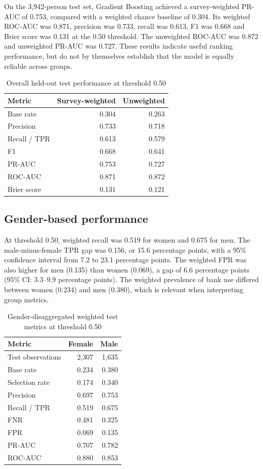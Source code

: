 \documentclass[11pt,a4paper]{article}
\begin{document}
On the 3,942-person test set, Gradient Boosting achieved a survey-weighted PR-AUC of 0.753, compared with a weighted chance baseline of 0.304. Its weighted ROC-AUC was 0.871, precision was 0.733, recall was 0.613, F1 was 0.668 and Brier score was 0.131 at the 0.50 threshold. The unweighted ROC-AUC was 0.872 and unweighted PR-AUC was 0.727. These results indicate useful ranking performance, but do not by themselves establish that the model is equally reliable across groups.

\begin{table}[H]
\centering
\caption{Overall held-out test performance at threshold 0.50}
\label{tab:test}
\begin{tabular}{lrr}
\toprule
Metric & Survey-weighted & Unweighted\\
\midrule
Base rate & 0.304 & 0.263\\
Precision & 0.733 & 0.718\\
Recall / TPR & 0.613 & 0.579\\
F1 & 0.668 & 0.641\\
PR-AUC & 0.753 & 0.727\\
ROC-AUC & 0.871 & 0.872\\
Brier score & 0.131 & 0.121\\
\bottomrule
\end{tabular}
\end{table}

\subsection{Gender-based performance}

At threshold 0.50, weighted recall was 0.519 for women and 0.675 for men. The male-minus-female TPR gap was 0.156, or 15.6 percentage points, with a 95\% confidence interval from 7.2 to 23.1 percentage points. The weighted FPR was also higher for men (0.135) than women (0.069), a gap of 6.6 percentage points (95\% CI: 3.3--9.9 percentage points). The weighted prevalence of bank use differed between women (0.234) and men (0.380), which is relevant when interpreting group metrics.

\begin{table}[H]
\centering
\caption{Gender-disaggregated weighted test metrics at threshold 0.50}
\label{tab:gender}
\begin{tabular}{lrr}
\toprule
Metric & Female & Male\\
\midrule
Test observations & 2,307 & 1,635\\
Base rate & 0.234 & 0.380\\
Selection rate & 0.174 & 0.340\\
Precision & 0.697 & 0.753\\
Recall / TPR & 0.519 & 0.675\\
FNR & 0.481 & 0.325\\
FPR & 0.069 & 0.135\\
PR-AUC & 0.707 & 0.782\\
ROC-AUC & 0.880 & 0.853\\
\bottomrule
\end{tabular}
\end{table}
\end{document}
